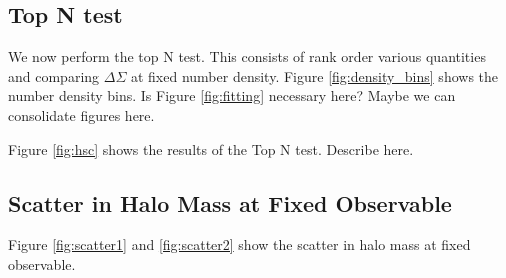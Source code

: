 \documentclass[a4paper,fleqn,usenatbib]{mnras}
\begin{document}
\subsection{Top N test}

We now perform the top N test. This consists of rank order various quantities and comparing $\Delta\Sigma$ at fixed number density. Figure \ref{fig:density_bins} shows the number density bins. Is Figure \ref{fig:fitting} necessary here? Maybe we can consolidate figures here.


Figure \ref{fig:hsc} shows the results of the Top N test. Describe here.

       
       
    

\subsection{Scatter in Halo Mass at Fixed Observable}

Figure \ref{fig:scatter1} and \ref{fig:scatter2} show the scatter in halo mass at fixed observable.
\end{document}
